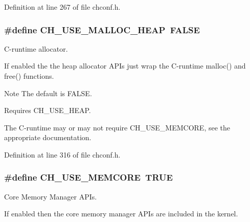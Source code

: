 Definition at line 267 of file chconf.\+h.

\hypertarget{group__config_ga4785d390f3a787916c5a5c41e953577d}{}
\subsubsection[{C\+H\+\_\+\+U\+S\+E\+\_\+\+M\+A\+L\+L\+O\+C\+\_\+\+H\+E\+A\+P}]{\setlength{\rightskip}{0pt plus 5cm}\#define C\+H\+\_\+\+U\+S\+E\+\_\+\+M\+A\+L\+L\+O\+C\+\_\+\+H\+E\+A\+P~F\+A\+L\+S\+E}\label{group__config_ga4785d390f3a787916c5a5c41e953577d}


C-\/runtime allocator. 

If enabled the the heap allocator A\+P\+Is just wrap the C-\/runtime {\ttfamily malloc()} and {\ttfamily free()} functions.

\begin{DoxyNote}{Note}
The default is {\ttfamily F\+A\+L\+S\+E}. 

Requires {\ttfamily C\+H\+\_\+\+U\+S\+E\+\_\+\+H\+E\+A\+P}. 

The C-\/runtime may or may not require {\ttfamily C\+H\+\_\+\+U\+S\+E\+\_\+\+M\+E\+M\+C\+O\+R\+E}, see the appropriate documentation. 
\end{DoxyNote}


Definition at line 316 of file chconf.\+h.

\hypertarget{group__config_gaff85f4d919dac30a337ce2f34e2fa1af}{}
\subsubsection[{C\+H\+\_\+\+U\+S\+E\+\_\+\+M\+E\+M\+C\+O\+R\+E}]{\setlength{\rightskip}{0pt plus 5cm}\#define C\+H\+\_\+\+U\+S\+E\+\_\+\+M\+E\+M\+C\+O\+R\+E~T\+R\+U\+E}\label{group__config_gaff85f4d919dac30a337ce2f34e2fa1af}


Core Memory Manager A\+P\+Is. 

If enabled then the core memory manager A\+P\+Is are included in the kernel.

